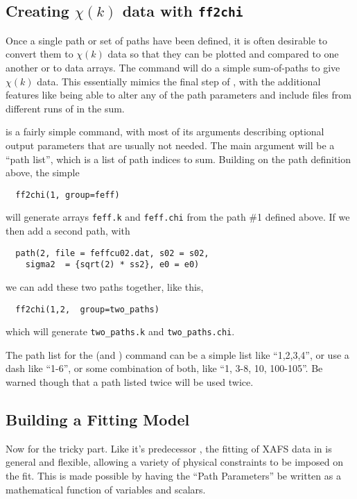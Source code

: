 \subsection{Creating $\chi(k)$ data with {\texttt{ff2chi}}}
\label{Ch:FEFFIT-ff2chi} 

Once a single path or set of paths have been defined, it is often desirable
to convert them to $\chi(k)$ data so that they can be plotted and compared
to one another or to data arrays.  The {} command will do a
simple sum-of-paths to give $\chi(k)$ data.  This essentially mimics the
final step of {\feff}, with the additional features like being able to
alter any of the path parameters and include {\feffndat} files from
different runs of {\feff} in the sum.

{}
{} is a fairly simple command, with most of its arguments
describing optional output parameters that are usually not needed.  The
main argument will be a ``path list'', which is a list of path indices to
sum.   Building on the path definition above, the simple
\begin{verbatim}
  ff2chi(1, group=feff)
\end{verbatim}
\noindent
will generate arrays {\tt{feff.k}} and {\tt{feff.chi}} from the path \#1
defined above.  If we then add a second path, with
\begin{verbatim}
  path(2, file = feffcu02.dat, s02 = s02, 
    sigma2  = {sqrt(2) * ss2}, e0 = e0)
\end{verbatim}
\noindent
we can  add these two paths together, like this,
\begin{verbatim}
  ff2chi(1,2,  group=two_paths) 
\end{verbatim}
\noindent
which will generate  {\tt{two\_paths.k}} and {\tt{two\_paths.chi}}.

The path list for the {} (and {}) command can be a
simple list like ``1,2,3,4'', or use a dash like ``1-6'', or some
combination of both, like ``1, 3-8, 10, 100-105''.  Be warned though that a
path listed twice will be used twice.
{}

\subsection{Building a Fitting Model} \label{Ch:FEFFIT-model}

Now for the tricky part.  Like it's predecessor {\feffit}, the fitting of
XAFS data in {\ifeffit} is general and flexible, allowing a variety of
physical constraints to be imposed on the fit.  This is made possible by
having the ``Path Parameters'' be written as a mathematical function of
variables and scalars. 

